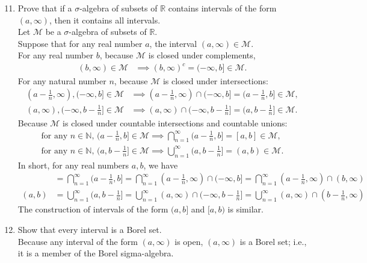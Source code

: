 \begin{enumerate}
	\setcounter{enumi}{10}
	\item Prove that if a $\sigma$-algebra of subsets of $\mathbb{R}$ contains intervals of the form $(a,\infty)$, then it contains all intervals.\\
	Let $\mathcal{M}$ be a $\sigma$-algebra of subsets of $\mathbb{R}$.\\
	Suppose that for any real number $a$, the interval $(a,\infty)\in\mathcal{M}$.\\
	For any real number $b$, because $\mathcal{M}$ is closed under complements,
	\begin{align*}
		(b,\infty)\in\mathcal{M}&\implies(b,\infty)^c=(-\infty,b]\in\mathcal{M}.
	\end{align*}
	For any natural number $n$, because $\mathcal{M}$ is closed under intersections:
	\begin{align*}
		(a-\frac{1}{n},\infty), (-\infty,b]\in\mathcal{M}&\implies(a-\frac{1}{n},\infty)\cap(-\infty,b]=(a-\frac{1}{n},b]\in\mathcal{M},\\
		(a,\infty), (-\infty,b-\frac{1}{n}]\in\mathcal{M}&\implies(a,\infty)\cap(-\infty,b-\frac{1}{n}]=(a,b-\frac{1}{n}]\in\mathcal{M}.
	\end{align*}
	Because $\mathcal{M}$ is closed under countable intersections and countable unions:
	\begin{align*}
		\text{for any $n\in\mathbb{N}$, }(a-\frac{1}{n},b]\in\mathcal{M}\implies\bigcap_{n=1}^\infty(a-\frac{1}{n},b]=[a,b]\in\mathcal{M},\\
		\text{for any $n\in\mathbb{N}$, }(a,b-\frac{1}{n}]\in\mathcal{M}\implies\bigcup_{n=1}^\infty(a,b-\frac{1}{n}]=(a,b)\in\mathcal{M}.
	\end{align*}
	In short, for any real numbers $a,b$, we have
	\begin{align*}
		[a,b]&=\bigcap_{n=1}^\infty(a-\frac{1}{n},b]=\bigcap_{n=1}^\infty(a-\frac{1}{n},\infty)\cap(-\infty,b]=\bigcap_{n=1}^\infty(a-\frac{1}{n},\infty)\cap(b,\infty)\\
		(a,b)&=\bigcup_{n=1}^\infty(a,b-\frac{1}{n}]=\bigcup_{n=1}^\infty(a,\infty)\cap(-\infty,b-\frac{1}{n}]=\bigcup_{n=1}^\infty(a,\infty)\cap(b-\frac{1}{n},\infty)
	\end{align*}
	The construction of intervals of the form $(a,b]$ and $[a,b)$ is similar.
	\item Show that every interval is a Borel set.\\
	Because any interval of the form $(a,\infty)$ is open, $(a,\infty)$ is a Borel set; i.e., it is a member of the Borel sigma-algebra.

\end{enumerate}
